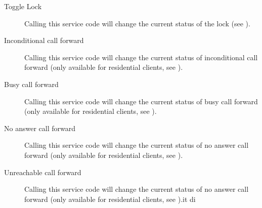\documentclass[letterpaper,10pt,spanish]{sphinxmanual}
\begin{document}
\begin{description}
\item[{Toggle Lock}] \leavevmode{}\label{administration_portal/platform/services:term-toggle-lock}
Calling this service code will change the current status of the lock (see {\hyperref[administration_portal/client/vpbx/routing_tools/route_locks:route\string-locks]{}}).

\item[{Inconditional call forward}] \leavevmode{}\label{administration_portal/platform/services:term-inconditional-call-forward}
Calling this service code will change the current status of inconditional call forward (only available for
residential clients, see {\hyperref[administration_portal/client/residential/residential_devices:residential\string-devices\string-cfw]{}}).

\item[{Busy call forward}] \leavevmode{}\label{administration_portal/platform/services:term-busy-call-forward}
Calling this service code will change the current status of busy call forward (only available for
residential clients, see {\hyperref[administration_portal/client/residential/residential_devices:residential\string-devices\string-cfw]{}}).

\item[{No answer call forward}] \leavevmode{}\label{administration_portal/platform/services:term-no-answer-call-forward}
Calling this service code will change the current status of no answer call forward (only available for
residential clients, see {\hyperref[administration_portal/client/residential/residential_devices:residential\string-devices\string-cfw]{}}).

\item[{Unreachable call forward}] \leavevmode{}\label{administration_portal/platform/services:term-unreachable-call-forward}
Calling this service code will change the current status of no answer call forward (only available for
residential clients, see {\hyperref[administration_portal/client/residential/residential_devices:residential\string-devices\string-cfw]{}}).it di

\end{description}
\end{document}
